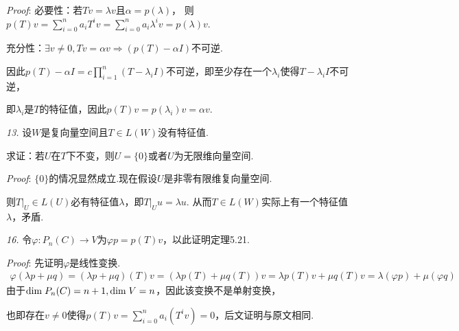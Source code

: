 \textit{Proof}:
必要性：若\(Tv=\lambda v\)且\(\alpha=p(\lambda)\)，
则\(p(T)v=\sum_{i=0}^n a_iT^iv=\sum_{i=0}^n a_i\lambda^iv=p(\lambda)v\).

充分性：\(\exists v \ne 0,Tv=\alpha v \Rightarrow (p(T)-\alpha I)\)不可逆.

因此\(p(T)-\alpha I=c\prod_{i=1}^n (T-\lambda_i I)\)不可逆，即至少存在一个\(\lambda_i\)使得\(T-\lambda_i I\)不可逆，

即\(\lambda_i\)是\(T\)的特征值，因此\(p(T)v=p(\lambda_i)v=\alpha v\).

\hspace*{\fill}

\textit{13.}
设\(W\)是复向量空间且\(T \in L(W)\)没有特征值.

求证：若\(U\)在\(T\)下不变，则\(U=\{0\}\)或者\(U\)为无限维向量空间.

\textit{Proof}:
\(\{0\}\)的情况显然成立.现在假设\(U\)是非零有限维复向量空间.

则\(T|_U \in L(U)\)必有特征值\(\lambda\)，即\(T|_U u=\lambda u\).
从而\(T \in L(W)\)实际上有一个特征值\(\lambda\)，矛盾.

\hspace*{\fill}

\textit{16.}
令\(\varphi:P_n(C) \rightarrow V\)为\(\varphi p=p(T)v\)，以此证明定理5.21.

\textit{Proof}:
先证明\(\varphi\)是线性变换.
    \begin{align*}
        \varphi(\lambda p+\mu q)=(\lambda p+\mu q)(T)v=(\lambda p(T)+\mu q(T))v
        =\lambda p(T)v+\mu q(T)v=\lambda(\varphi p)+\mu(\varphi q)
    \end{align*}
由于\(\mathrm{dim \;} P_n(C)=n+1,\mathrm{dim \;} V=n\)，因此该变换不是单射变换，

也即存在\(v \ne 0\)使得\(p(T)v=\sum_{i=0}^n a_i(T^iv)=0\)，后文证明与原文相同.

